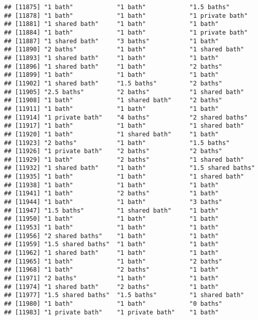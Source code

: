 \documentclass[
]{article}
\begin{document}
\begin{verbatim}
## [11875] "1 bath"            "1 bath"            "1.5 baths"        
## [11878] "1 bath"            "1 bath"            "1 private bath"   
## [11881] "1 shared bath"     "1 bath"            "1 bath"           
## [11884] "1 bath"            "1 bath"            "1 private bath"   
## [11887] "1 shared bath"     "3 baths"           "1 bath"           
## [11890] "2 baths"           "1 bath"            "1 shared bath"    
## [11893] "1 shared bath"     "1 bath"            "1 bath"           
## [11896] "1 shared bath"     "1 bath"            "2 baths"          
## [11899] "1 bath"            "1 bath"            "1 bath"           
## [11902] "1 shared bath"     "1.5 baths"         "2 baths"          
## [11905] "2.5 baths"         "2 baths"           "1 shared bath"    
## [11908] "1 bath"            "1 shared bath"     "2 baths"          
## [11911] "1 bath"            "1 bath"            "1 bath"           
## [11914] "1 private bath"    "4 baths"           "2 shared baths"   
## [11917] "1 bath"            "1 bath"            "1 shared bath"    
## [11920] "1 bath"            "1 shared bath"     "1 bath"           
## [11923] "2 baths"           "1 bath"            "1.5 baths"        
## [11926] "1 private bath"    "2 baths"           "2 baths"          
## [11929] "1 bath"            "2 baths"           "1 shared bath"    
## [11932] "1 shared bath"     "1 bath"            "1.5 shared baths" 
## [11935] "1 bath"            "1 bath"            "1 shared bath"    
## [11938] "1 bath"            "1 bath"            "1 bath"           
## [11941] "1 bath"            "2 baths"           "1 bath"           
## [11944] "1 bath"            "1 bath"            "3 baths"          
## [11947] "1.5 baths"         "1 shared bath"     "1 bath"           
## [11950] "1 bath"            "1 bath"            "1 bath"           
## [11953] "1 bath"            "1 bath"            "1 bath"           
## [11956] "2 shared baths"    "1 bath"            "1 bath"           
## [11959] "1.5 shared baths"  "1 bath"            "1 bath"           
## [11962] "1 shared bath"     "1 bath"            "1 bath"           
## [11965] "1 bath"            "1 bath"            "2 baths"          
## [11968] "1 bath"            "2 baths"           "1 bath"           
## [11971] "2 baths"           "1 bath"            "1 bath"           
## [11974] "1 shared bath"     "2 baths"           "1 bath"           
## [11977] "1.5 shared baths"  "1.5 baths"         "1 shared bath"    
## [11980] "1 bath"            "1 bath"            "0 baths"          
## [11983] "1 private bath"    "1 private bath"    "1 bath"           

\end{verbatim}
\end{document}
